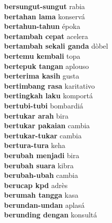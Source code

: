 \textbf{ bersungut-sungut  } rabia \\
\textbf{ bertahan lama  } konservá \\
\textbf{ bertahun-tahun  } époka \\
\textbf{ bertambah cepat  } acelera \\
\textbf{ bertambah sekali ganda  } dòbel \\
\textbf{ bertemu kembali  } topa \\
\textbf{ bertepuk tangan  } aplouso \\
\textbf{ berterima kasih  } gusta \\
\textbf{ bertimbang rasa  } karitativo \\
\textbf{ bertingkah laku  } komportá \\
\textbf{ bertubi-tubi  } bombardiá \\
\textbf{ bertukar arah  } bira \\
\textbf{ bertukar pakaian  } cambia \\
\textbf{ bertukar-tukar  } cambia \\
\textbf{ bertura-tura  } keha \\
\textbf{ berubah menjadi  } bira \\
\textbf{ berubah suara  } kibra \\
\textbf{ berubah-ubah  } cambia \\
\textbf{ berucap kpd  } adrès \\
\textbf{ berumah tangga  } kasa \\
\textbf{ berundan-undan  } aplasá \\
\textbf{ berunding dengan  } konsultá \\
